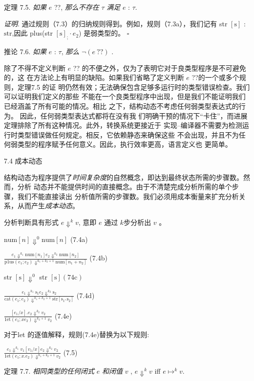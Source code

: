 定理 7.5. {\it 如果} $e$ ??, {\it 那么不存在} $\tau$ {\it 满足} $e$ : $\tau.$

{\it 证明}. 通过规则（7.3）的归纳规则得到。例如，规则（7.3a），我们记有 str $[\mathrm{s}]$ : $\mathrm{s}\mathrm{t}\mathrm{r}$,因此 plus(str $[\mathrm{s}]_{;}\cdot e_{2}$) 是弱类型的。  $\square $

推论 7.6. {\it 如果} $e$ : $\tau$, {\it 那么} $\neg (e\ ??)$ .

除了不得不定义判断 $e$ ?? 的不便之外，仅为了表明它对于良类型程序是不可避免的，这
在方法论上有明显的缺陷。如果我们省略了定义判断 $e$ ??的一个或多个规则，定理7.5 的证
明仍然有效；无法确保包含足够多运行时的类型错误检查。我们可以证明我们定义的那些
不能在一个良类型程序中出现，但是我们不能证明我们已经涵盖了所有可能的情况。相比
之下，结构动态不考虑任何弱类型表达式的行为。 因此，任何弱类型表达式都将在没有我
们明确干预的情况下“卡住”，而进展定理排除了所有这种情况。此外，转换系统更接近于
实现--编译器不需要为检测运行时类型错误做任何规定。相反，它依赖静态来确保这些
不会出现，并且不为任何弱类型的程序赋予任何意义。因此，执行效率更高，语言定义也
更简单。

7.4 成本动态

结构动态为程序提供了{\it 时间复杂度}的自然概念，即达到最终状态所需的步骤数。然而，分析
动态并不能提供时间的直接概念。由于不清楚完成分析所需的单个步骤，我们不能直接读出
分析值所需的步骤数。我们必须用成本衡量来扩充分析关系，从而产生{\it 成本动态}。 

分析判断具有形式 $e\Downarrow^{k}v$, 意即 $e$ 通过 $k$步分析出 $v$ 。
\begin{center}
$\mathrm{n}\mathrm{u}\mathrm{m}[n]\Downarrow^{0}\mathrm{n}\mathrm{u}\mathrm{m}[n]$   (7.4a)
\end{center}

\begin{center}
$\displaystyle \frac{e_{1}\Downarrow^{k_{1}}\mathrm{n}\mathrm{u}\mathrm{m}[n_{1}]e_{2}\Downarrow^{k_{2}}\mathrm{n}\mathrm{u}\mathrm{m}[n_{2}]}{\mathrm{p}1\mathrm{u}\mathrm{s}(e_{1};e_{2})\Downarrow^{k_{1}+k_{2}+1}\mathrm{n}\mathrm{u}\mathrm{m}[n_{1}+n_{2}]}$   (7.4b)
\end{center}
str $[\mathrm{s}] \Downarrow^{0}$ str $[\mathrm{s}] (74\mathrm{c})$
\begin{center}
$\displaystyle \frac{e_{1}\Downarrow^{k_{1}}\mathrm{s}_{1}e_{2}\Downarrow^{k_{2}}\mathrm{s}_{2}}{\mathrm{c}\mathrm{a}\mathrm{t}(e_{1};e_{2})\Downarrow^{k_{1}+k_{2}+1}\mathrm{s}\mathrm{t}\mathrm{r}[\mathrm{s}_{1^{\wedge}}\mathrm{s}_{2}]}$   (7.4d)

$\displaystyle \frac{[e_{1}/x].e_{2}\Downarrow^{k_{2}}v_{2}}{1\mathrm{e}\mathrm{t}(e_{1};xe_{2})\Downarrow^{k_{2}+1}v_{2}}$   (7.4e)
\end{center}
对于let 的逐值解释，规则(7.4e)替换为以下规则:
\begin{center}
$\displaystyle \frac{e_{1}\Downarrow^{k_{1}}v_{1}[v_{1}/x]e_{2}\Downarrow^{k_{2}}v_{2}}{1\mathrm{e}\mathrm{t}(e_{1};x.e_{2})\Downarrow^{k_{1}+k_{2}+1}v_{2}}$   (7.5)
\end{center}
定理 7.7. {\it 相同类型的任何闭式} $e$ {\it 和闭值} $v$ , $e\Downarrow^{k}v$ iff $e\mapsto^{k}v.$

